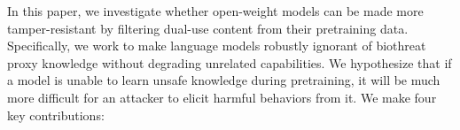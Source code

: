 In this paper, we investigate whether open-weight models can be made more tamper-resistant by filtering dual-use content from their pretraining data.
Specifically, we work to make language models robustly ignorant of biothreat proxy knowledge \citep{Li2024TheWB} without degrading unrelated capabilities. 
We hypothesize that if a model is unable to learn unsafe knowledge during pretraining, it will be much more difficult for an attacker to elicit harmful behaviors from it. 
We make four key contributions:



